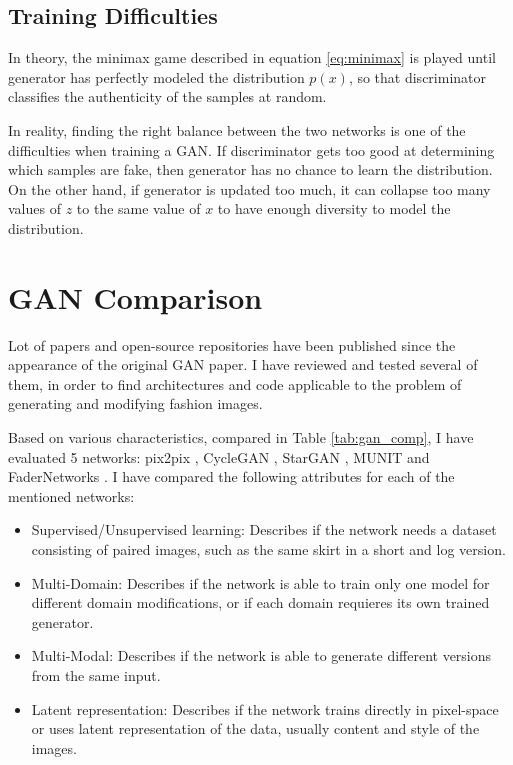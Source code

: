 \documentclass{article}
\begin{document}
\subsection{Training Difficulties}
In theory, the minimax game described in equation \ref{eq:minimax} is played until generator has perfectly modeled the distribution $p(x)$, so that discriminator classifies the authenticity of the samples at random. 

In reality, finding the right balance between the two networks is one of the difficulties when training a GAN. If discriminator gets too good at determining which samples are fake, then generator has no chance to learn the distribution. On the other hand, if generator is updated too much, it can collapse too many values of $z$ to the same value of $x$ to have enough diversity to model the distribution.

\section{GAN Comparison}
Lot of papers and open-source repositories have been published since the appearance of the original GAN paper. I have reviewed and tested several of them, in order to find architectures and code applicable to the problem of generating and modifying fashion images. 

Based on various characteristics, compared in Table \ref{tab:gan_comp}, I have evaluated  5 networks: pix2pix \cite{isola_image--image_2016}, CycleGAN \cite{zhu_unpaired_2017}, StarGAN \cite{choi_stargan:_2017}, MUNIT \cite{huang_multimodal_2018} and FaderNetworks \cite{lample_fader_2017}. I have compared the following attributes for each of the mentioned networks:
\begin{itemize}
\item Supervised/Unsupervised learning: Describes if the network needs a dataset consisting of paired images, such as the same skirt in a short and log version.
\item Multi-Domain: Describes if the network is able to train only one model for different domain modifications, or if each domain requieres its own trained generator.
\item Multi-Modal: Describes if the network is able to generate different versions from the same input.
\item Latent representation: Describes if the network trains directly in pixel-space or uses latent representation of the data, usually content and style of the images.
\end{itemize}
\end{document}
